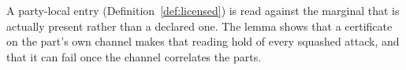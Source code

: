 
A party-local entry (Definition~\ref{def:licensed}) is read against the
marginal that is actually present rather than a declared one. The lemma shows
that a certificate on the part's own channel makes that reading hold of every
squashed attack, and that it can fail once the channel correlates the parts.

